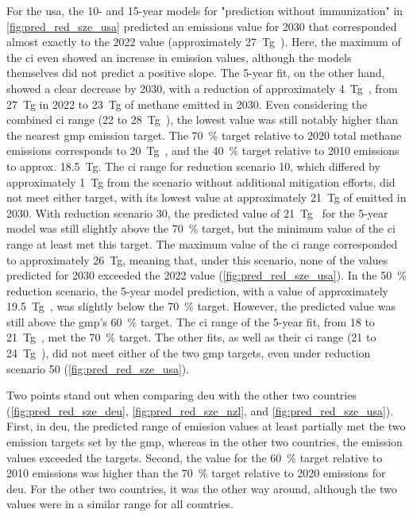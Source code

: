For the \acrshort{usa}, the 10- and 15-year models for "prediction without immunization" in \cref{fig:pred_red_sze_usa} predicted an emissions value for 2030 that corresponded almost exactly to the 2022 value (approximately 27~Tg~). Here, the maximum of the \acrshort{ci} even showed an increase in emission values, although the models themselves did not predict a positive slope. The 5-year fit, on the other hand, showed a clear decrease by 2030, with a reduction of approximately 4~Tg~, from 27~Tg in 2022 to 23~Tg of methane emitted in 2030. Even considering the combined \acrshort{ci} range (22 to 28~Tg~), the lowest value was still notably higher than the nearest \acrshort{gmp} emission target. The 70~\% target relative to 2020 total methane emissions corresponds to 20~Tg~, and the 40~\% target relative to 2010 emissions to approx. 18.5~Tg.
The \acrlong{ci} range for reduction scenario 10, which differed by approximately 1~Tg from the scenario without additional mitigation efforts, did not meet either target, with its lowest value at approximately 21~Tg of emitted  in 2030.
With reduction scenario 30, the predicted value of 21~Tg~ for the 5-year model was still slightly above the 70~\% target, but the minimum value of the \acrshort{ci} range at least met this target. The maximum value of the \acrshort{ci} range corresponded to approximately 26~Tg, meaning that, under this scenario, none of the values predicted for 2030 exceeded the 2022 value (\cref{fig:pred_red_sze_usa}).
In the 50~\% reduction scenario, the 5-year model prediction, with a value of approximately 19.5~Tg~, was slightly below the 70~\% target. However, the predicted value was still above the \acrshort{gmp}'s 60~\% target. The \acrshort{ci} range of the 5-year fit, from 18 to 21~Tg~, met the 70~\% target.
The other fits, as well as their \acrshort{ci} range (21 to 24~Tg~), did not meet either of the two \acrshort{gmp} targets, even under reduction scenario 50 (\cref{fig:pred_red_sze_usa}).

Two points stand out when comparing \acrshort{deu} with the other two countries (\cref{fig:pred_red_sze_deu}, \cref{fig:pred_red_sze_nzl}, and \cref{fig:pred_red_sze_usa}).
First, in \acrshort{deu}, the predicted range of emission values at least partially met the two emission targets set by the \acrfull{gmp}, whereas in the other two countries, the emission values exceeded the targets.
Second, the value for the 60~\% target relative to 2010 emissions was higher than the 70~\% target relative to 2020 emissions for \acrshort{deu}. For the other two countries, it was the other way around, although the two values were in a similar range for all countries.

